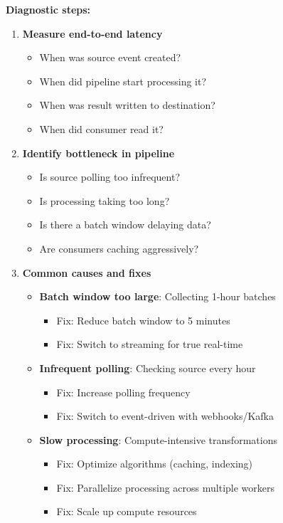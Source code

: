 \textbf{Diagnostic steps:}
\begin{enumerate}
    \item \textbf{Measure end-to-end latency}
        \begin{itemize}
            \item When was source event created?
            \item When did pipeline start processing it?
            \item When was result written to destination?
            \item When did consumer read it?
        \end{itemize}

    \item \textbf{Identify bottleneck in pipeline}
        \begin{itemize}
            \item Is source polling too infrequent?
            \item Is processing taking too long?
            \item Is there a batch window delaying data?
            \item Are consumers caching aggressively?
        \end{itemize}

    \item \textbf{Common causes and fixes}
        \begin{itemize}
            \item \textbf{Batch window too large}: Collecting 1-hour batches
                \begin{itemize}
                    \item Fix: Reduce batch window to 5 minutes
                    \item Fix: Switch to streaming for true real-time
                \end{itemize}

            \item \textbf{Infrequent polling}: Checking source every hour
                \begin{itemize}
                    \item Fix: Increase polling frequency
                    \item Fix: Switch to event-driven with webhooks/Kafka
                \end{itemize}

            \item \textbf{Slow processing}: Compute-intensive transformations
                \begin{itemize}
                    \item Fix: Optimize algorithms (caching, indexing)
                    \item Fix: Parallelize processing across multiple workers
                    \item Fix: Scale up compute resources
                \end{itemize}
        \end{itemize}
\end{enumerate}


